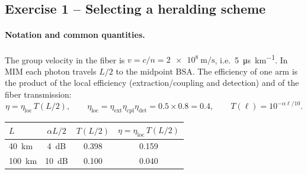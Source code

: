 
\subsection{Exercise 1 -- Selecting a heralding scheme}
\label{sec:q1}

\paragraph{Notation and common quantities.}
The group velocity in the fiber is $v = c/n = \SI{2e8}{\metre\per\second}$, i.e.\ \SI{5}{\micro\second\per\kilo\metre}.
In MIM each photon travels $L/2$ to the midpoint BSA. The efficiency of one arm is the product of the
local efficiency (extraction/coupling and detection) and of the fiber transmission:
\begin{equation}
  \eta = \eta_\mathrm{loc}\,T(L/2),
  \qquad \eta_\mathrm{loc} = \eta_\mathrm{ext}\eta_\mathrm{cpl}\eta_\mathrm{det} = 0.5\times0.8 = 0.4,
  \qquad T(\ell) = 10^{-\alpha \ell/10}.
\end{equation}
\begin{center}
\begin{tabular}{lccc}
  \toprule
  $L$ & $\alpha L/2$ & $T(L/2)$ & $\eta = \eta_\mathrm{loc}\,T(L/2)$ \\
  \midrule
  \SI{40}{\kilo\metre}  & \SI{4}{dB}  & 0.398 & 0.159 \\
  \SI{100}{\kilo\metre} & \SI{10}{dB} & 0.100 & 0.040 \\
  \bottomrule
\end{tabular}
\end{center}

